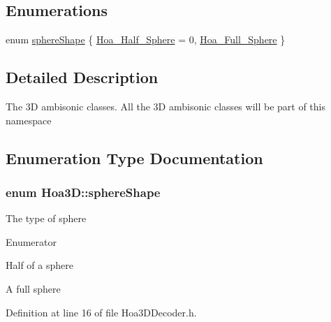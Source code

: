 \subsection*{Enumerations}
\begin{DoxyCompactItemize}
\item 
enum \hyperlink{namespace_hoa3_d_a96e1558dd670aa7cddab38a58aa10c49}{sphere\-Shape} \{ \hyperlink{namespace_hoa3_d_a96e1558dd670aa7cddab38a58aa10c49a688ab39f396b4912d261dc7a89e7dba8}{Hoa\-\_\-\-Half\-\_\-\-Sphere} = 0, 
\hyperlink{namespace_hoa3_d_a96e1558dd670aa7cddab38a58aa10c49aeb2d6c7f779a838421f9999a46a2ca22}{Hoa\-\_\-\-Full\-\_\-\-Sphere}
 \}
\end{DoxyCompactItemize}


\subsection{Detailed Description}
The 3\-D ambisonic classes. All the 3\-D ambisonic classes will be part of this namespace 

\subsection{Enumeration Type Documentation}
\hypertarget{namespace_hoa3_d_a96e1558dd670aa7cddab38a58aa10c49}{
\subsubsection[{sphere\-Shape}]{\setlength{\rightskip}{0pt plus 5cm}enum {\bf Hoa3\-D\-::sphere\-Shape}}}\label{namespace_hoa3_d_a96e1558dd670aa7cddab38a58aa10c49}
The type of sphere \begin{Desc}
\item[Enumerator]\par
\begin{description}
\item[{\em 
\hypertarget{namespace_hoa3_d_a96e1558dd670aa7cddab38a58aa10c49a688ab39f396b4912d261dc7a89e7dba8}{Hoa\-\_\-\-Half\-\_\-\-Sphere}\label{namespace_hoa3_d_a96e1558dd670aa7cddab38a58aa10c49a688ab39f396b4912d261dc7a89e7dba8}
}]Half of a sphere \item[{\em 
\hypertarget{namespace_hoa3_d_a96e1558dd670aa7cddab38a58aa10c49aeb2d6c7f779a838421f9999a46a2ca22}{Hoa\-\_\-\-Full\-\_\-\-Sphere}\label{namespace_hoa3_d_a96e1558dd670aa7cddab38a58aa10c49aeb2d6c7f779a838421f9999a46a2ca22}
}]A full sphere \end{description}
\end{Desc}


Definition at line 16 of file Hoa3\-D\-Decoder.\-h.

